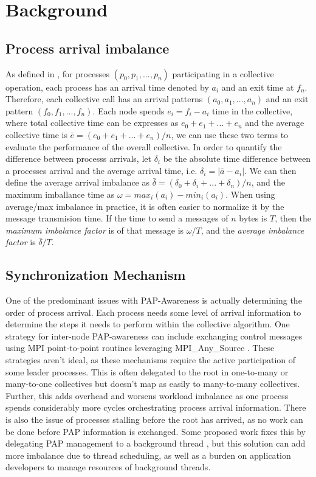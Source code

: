 \section{Background}

\subsection{Process arrival imbalance}
As defined in \cite{Faraj2008StudyProcArrivalMPIColl}, for processes $(p_0, p_1,...,p_n)$ participating in a collective operation, each process has an arrival time denoted by $a_i$ and an exit time at $f_n$.
Therefore, each collective call has an arrival patterns $(a_0, a_1, ..., a_n)$ and an exit pattern $(f_0, f_1, ..., f_n)$.
Each node spends $e_i = f_i - a_i$ time in the collective, where total collective time can be expresses as $e_0 + e_1 + ... + e_n$ and the average collective time is $\bar{e} = (e_0 + e_1 + ... + e_n)/n$, we can use these two terms to evaluate the performance of the overall collective.
In order to quantify the difference between processs arrivals, let $\delta_i$ be the absolute time difference between a processes arrival and the average arrival time, i.e. $\delta_i = |\bar{a} - a_i|$. 
We can then define the average arrival imbalance as $\bar{\delta}=(\delta_0 + \delta_i + ... + \delta_n)/n$, and the maximum imballance time as $\omega = max_i(a_i)-min_i(a_i)$.
When using average/max imbalance in practice, it is often easier to normalize it by the message transmision time.
If the time to send a messages of $n$ bytes is $T$, then the \textit{maximum imbalance factor} is of that message is $\omega/T$, and the \textit{average imbalance factor} is $\bar{\delta}/T$.


\subsection{Synchronization Mechanism} 
One of the predominant issues with PAP-Awareness is actually determining the order of process arrival.
Each process needs some level of arrival information to determine the steps it needs to perform within the collective algorithm. 
One strategy for inter-node PAP-awareness can include exchanging control messages using MPI point-to-point routines leveraging MPI\_Any\_Source \cite{Patarasuk2008EffBcastDifProcArr}.
These strategies aren't ideal, as these mechanisms require the active participation of some leader processes.
This is often delegated to the root in one-to-many or many-to-one collectives but doesn't map as easily to many-to-many collectives.
Further, this adds overhead and worsens workload imbalance as one process spends considerably more cycles orchestrating process arrival information.
There is also the issue of processes stalling before the root has arrived, as no work can be done before PAP information is exchanged.
Some proposed work fixes this by delegating PAP management to a background thread \cite{Proficz2018ImprvAllReduceForImbPAP, Proficz2020PAPAwareScatterGather, Proficz2021AllGatherResilientToImbPAP, Faraj2008StudyProcArrivalMPIColl}, but this solution can add more imbalance due to thread scheduling, as well as a burden on application developers to manage resources of background threads.


